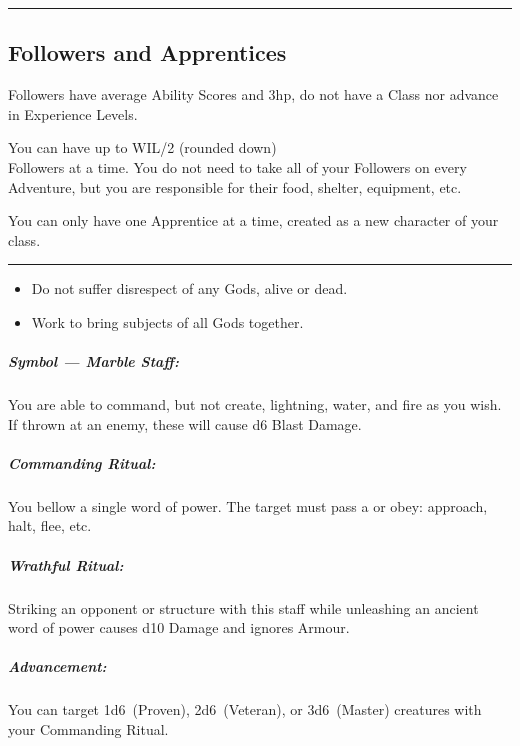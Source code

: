 \documentclass[itdr/core]{subfiles}
\begin{document}
\vfill


\vfill
\break

\hrule

\subsection{Followers and Apprentices}
Followers have average Ability Scores and 3hp, do not have a Class nor advance in Experience Levels.

You can have up to WIL/2 (rounded down)\\Followers at a time. You do not need to take all of your Followers on every Adventure, but you are responsible for their food, shelter, equipment, etc.

You can only have one Apprentice at a time, created as a new character of your class.

\vspace{\parskip}
\hrule

\skipline[2\baselineskip]


{\em\begin{itemize}
		\item Do not suffer disrespect of any Gods, alive or dead.
		\item Work to bring subjects of all Gods together.
\end{itemize}}

\subparagraph{Symbol --- Marble Staff:} You are able to command, but not create, lightning, water, and fire as you wish. If thrown at an enemy, these will cause d6 Blast Damage.

\subparagraph{Commanding Ritual:} You bellow a single word of power. The target must pass a  or obey: approach, halt, flee, etc.

\subparagraph{Wrathful Ritual:} Striking an opponent or structure with this staff while unleashing an ancient word of power causes d10 Damage and ignores Armour.

\subparagraph{Advancement:} You can target 1d6~(Proven), 2d6~(Veteran), or 3d6~(Master) creatures with your Commanding Ritual.
\end{document}
